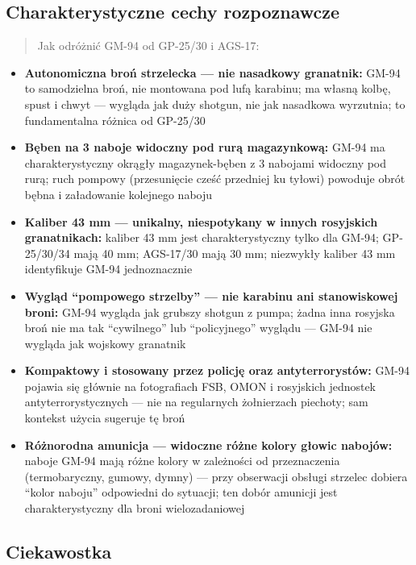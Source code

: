 \documentclass[12pt,oneside]{book}
\providecommand{\tightlist}{%
  \setlength{\itemsep}{0pt}\setlength{\parskip}{0pt}}
\begin{document}
\subsection{Charakterystyczne cechy
rozpoznawcze}\label{charakterystyczne-cechy-rozpoznawcze-100}

\begin{quote}
Jak odróżnić GM-94 od GP-25/30 i AGS-17:
\end{quote}

\begin{itemize}
\tightlist
\item
  \textbf{Autonomiczna broń strzelecka --- nie nasadkowy granatnik:}
  GM-94 to samodzielna broń, nie montowana pod lufą karabinu; ma własną
  kolbę, spust i chwyt --- wygląda jak duży shotgun, nie jak nasadkowa
  wyrzutnia; to fundamentalna różnica od GP-25/30
\item
  \textbf{Bęben na 3 naboje widoczny pod rurą magazynkową:} GM-94 ma
  charakterystyczny okrągły magazynek-bęben z 3 nabojami widoczny pod
  rurą; ruch pompowy (przesunięcie cześć przedniej ku tyłowi) powoduje
  obrót bębna i załadowanie kolejnego naboju
\item
  \textbf{Kaliber 43 mm --- unikalny, niespotykany w innych rosyjskich
  granatnikach:} kaliber 43 mm jest charakterystyczny tylko dla GM-94;
  GP-25/30/34 mają 40 mm; AGS-17/30 mają 30 mm; niezwykły kaliber 43 mm
  identyfikuje GM-94 jednoznacznie
\item
  \textbf{Wygląd ``pompowego strzelby'' --- nie karabinu ani
  stanowiskowej broni:} GM-94 wygląda jak grubszy shotgun z pumpa; żadna
  inna rosyjska broń nie ma tak ``cywilnego'' lub ``policyjnego''
  wyglądu --- GM-94 nie wygląda jak wojskowy granatnik
\item
  \textbf{Kompaktowy i stosowany przez policję oraz antyterrorystów:}
  GM-94 pojawia się głównie na fotografiach FSB, OMON i rosyjskich
  jednostek antyterrorystycznych --- nie na regularnych żołnierzach
  piechoty; sam kontekst użycia sugeruje tę broń
\item
  \textbf{Różnorodna amunicja --- widoczne różne kolory głowic nabojów:}
  naboje GM-94 mają różne kolory w zależności od przeznaczenia
  (termobaryczny, gumowy, dymny) --- przy obserwacji obsługi strzelec
  dobiera ``kolor naboju'' odpowiedni do sytuacji; ten dobór amunicji
  jest charakterystyczny dla broni wielozadaniowej
\end{itemize}

\subsection{Ciekawostka}\label{ciekawostka-100}
\end{document}
